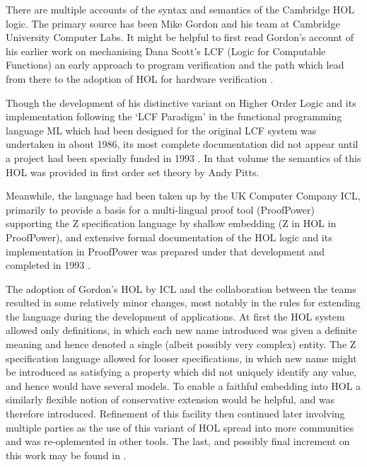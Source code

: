 There are multiple accounts of the syntax and semantics of the Cambridge HOL logic.
The primary source has been Mike Gordon and his team at Cambridge University Computer Labs.
It might be helpful to first read Gordon's account of his earlier work on mechanising Dana Scott's LCF (Logic for Computable Functions) an early approach to program verification and the path which lead from there to the adoption of HOL for hardware verification \cite{gordon2000}.

Though the development of his distinctive variant on Higher Order Logic and its implementation following the `LCF Paradigm' in the functional programming language ML which had been designed for the original LCF system was undertaken in about 1986, its most complete documentation did not appear until a project had been specially funded in 1993 \cite{gordon1993}.
In that volume the semantics of this HOL was provided in first order set theory by Andy Pitts\cite{pitts1993}.

Meanwhile, the language had been taken up by the UK Computer Company ICL, primarily to provide a basis for a multi-lingual proof tool (ProofPower) supporting the Z specification language by shallow embedding (Z in HOL in ProofPower\cite{arthan2005}), and extensive formal documentation of the HOL logic and its implementation in ProofPower was prepared under that development and completed in 1993 \cite{arthan2001a,arthan2001b,arthan2001c,arthan2001d,arthan2001e}.

The adoption of Gordon's HOL by ICL and the collaboration between the teams resulted in some relatively minor changes, most notably in the rules for extending the language during the development of applications.
At first the HOL system allowed only definitions, in which each new name introduced was given a definite meaning and hence denoted a single (albeit possibly very complex) entity.
The Z specification language allowed for looser specifications, in which new name might be introduced as satisfying a property which did not uniquely identify any value, and hence would have several models.
To enable a faithful embedding into HOL a similarly flexible notion of conservative extension would be helpful, and was therefore introduced.
Refinement of this facility then continued later involving multiple parties as the use of this variant of HOL spread into more communities and was re-oplemented in other tools.
The last, and possibly final increment on this work may be found in \cite{arthan2016}.
